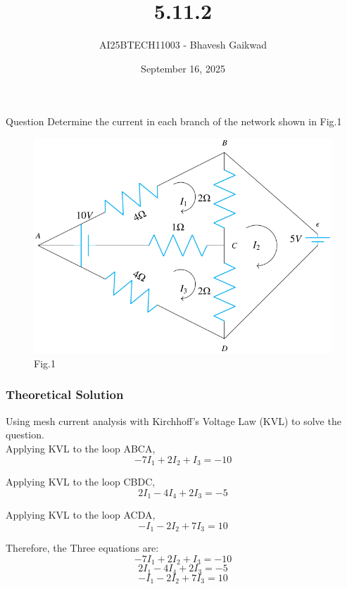 \documentclass{beamer}
\title
{5.11.2}
\date{September 16, 2025}
\author 
{AI25BTECH11003 - Bhavesh Gaikwad}
\begin{document}
\frame{\titlepage}
\begin{frame}{Question}
Determine the current in each branch of the network shown in Fig.1
\begin{figure}
    \centering
    \includegraphics[width=0.75\columnwidth]{figs/figQ.png}
    \caption{Fig.1}
    \label{fig:figs/fig1.png}
\end{figure}
\end{frame}


\begin{frame}[fragile]
    \frametitle{Theoretical Solution}
 Using mesh current analysis with Kirchhoff's Voltage Law (KVL) to solve the question.\\


Applying KVL to the loop ABCA,
\begin{equation}
-7I_1 + 2I_2 + I_3 = -10
\end{equation}


Applying KVL to the loop CBDC,
\begin{equation}
2I_1 - 4I_4 + 2I_3 = -5
\end{equation}

Applying KVL to the loop ACDA,
\begin{equation}
-I_1 - 2I_2 + 7I_3 = 10    
\end{equation}

Therefore, the Three equations are: 
$$ -7I_1 + 2I_2 + I_3 = -10$$
$$2I_1 - 4I_4 + 2I_3 = -5$$
$$-I_1 - 2I_2 + 7I_3 = 10$$\\
\end{frame}
\end{document}
